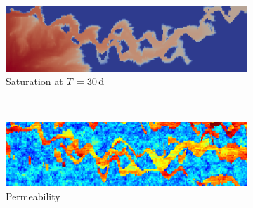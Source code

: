 \begin{figure}[ht]
\centering
\begin{subfigure}{0.49\textwidth}
\includegraphics[width=\textwidth]{figures/saturation_upperness_layer-35.png}
\caption{Saturation at $T = \unit[30]{d}$}
\label{fig:saturation_upperness_layer-35}
\end{subfigure}
~
\begin{subfigure}{0.49\textwidth}
\includegraphics[width=\textwidth]{figures/perm_upperness_layer-35.png}
\caption{Permeability}
\label{fig:perm_upperness_layer-35}
\end{subfigure}
\caption{}
\label{fig:upperness_layer-35}
\end{figure}